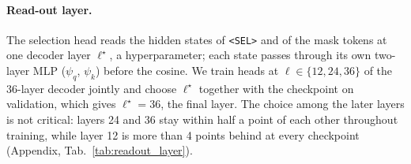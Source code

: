 \paragraph{Read-out layer.}
The selection head reads the hidden states of \texttt{<SEL>} and of the mask tokens at one decoder layer
$\ell^{\star}$, a hyperparameter; each state passes through its own two-layer MLP ($\psi_q$, $\psi_k$) before the
cosine. We train heads at $\ell\in\{12, 24, 36\}$ of the 36-layer decoder jointly and choose $\ell^{\star}$ together
with the checkpoint on validation, which gives $\ell^{\star}=36$, the final layer. The choice among the later layers is
not critical: layers 24 and 36 stay within half a point of each other throughout training, while layer 12 is more than
4 points behind at every checkpoint (Appendix, Tab.~\ref{tab:readout_layer}).
